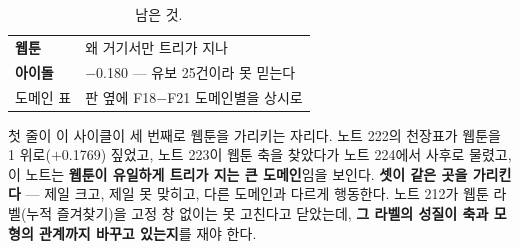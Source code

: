 \documentclass[10pt]{article}
\begin{document}

\begin{table}[t]
\centering\tsize
\caption{남은 것.}
\begin{tabular}{ll}
\toprule
\textbf{웹툰} & 왜 거기서만 트리가 지나 \\
\textbf{아이돌} & $-$0.180 --- 유보 25건이라 못 믿는다 \\
도메인 표 & 판 옆에 F18$-$F21 도메인별을 상시로 \\
\bottomrule
\end{tabular}
\end{table}

첫 줄이 이 사이클이 세 번째로 웹툰을 가리키는 자리다. 노트 222의 천장표가
웹툰을 1 위로($+$0.1769) 짚었고, 노트 223이 웹툰 축을 찾았다가 노트 224에서
사후로 물렸고, 이 노트는 \textbf{웹툰이 유일하게 트리가 지는 큰
도메인}임을 보인다. \textbf{셋이 같은 곳을 가리킨다} --- 제일 크고, 제일
못 맞히고, 다른 도메인과 다르게 행동한다. 노트 212가 웹툰 라벨(누적
즐겨찾기)을 고정 창 없이는 못 고친다고 닫았는데, \textbf{그 라벨의 성질이
축과 모형의 관계까지 바꾸고 있는지}를 재야 한다.
\end{document}
